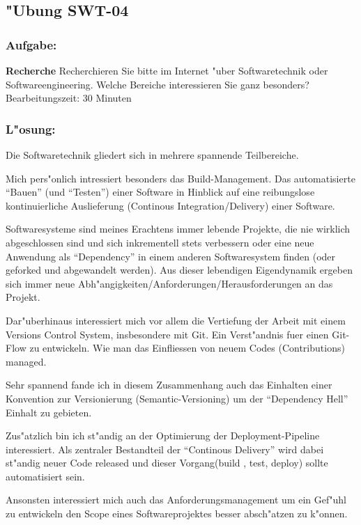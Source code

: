 \subsection{"Ubung SWT-04}
\subsubsection*{Aufgabe:}

\begin{framed}
\textbf{Recherche}
\smallbreak
Recherchieren Sie bitte im Internet "uber Softwaretechnik oder Softwareengineering. Welche Bereiche interessieren Sie ganz besonders?
\bigbreak
\small Bearbeitungszeit: 30 Minuten
\end{framed}
\bigbreak
\bigbreak
\subsubsection*{L"osung:}

Die Softwaretechnik gliedert sich in mehrere spannende Teilbereiche.

Mich pers"onlich intressiert besonders das Build-Management. Das automatisierte ``Bauen'' (und ``Testen'') einer Software in Hinblick auf eine reibungslose kontinuierliche Auslieferung (Continous Integration/Delivery) einer Software.

Softwaresysteme sind meines Erachtens immer lebende Projekte, die nie wirklich abgeschlossen sind und sich inkrementell stets verbessern oder eine neue Anwendung als ``Dependency'' in einem anderen Softwaresystem finden (oder geforked und abgewandelt werden).
Aus dieser lebendigen Eigendynamik ergeben sich immer neue Abh"angigkeiten/Anforderungen/Herausforderungen an das Projekt.

Dar"uberhinaus interessiert mich vor allem die Vertiefung der Arbeit mit einem Versions Control System, insbesondere mit Git.
Ein Verst"andnis fuer einen Git-Flow zu entwickeln. Wie man das Einfliessen von neuem Codes (Contributions) managed.

Sehr spannend fande ich in diesem Zusammenhang auch das Einhalten einer Konvention zur Versionierung (Semantic-Versioning) um der ``Dependency Hell'' Einhalt zu gebieten.

Zus"atzlich bin ich st"andig an der Optimierung der Deployment-Pipeline interessiert.
Als zentraler Bestandteil der ``Continous Delivery'' wird dabei st"andig neuer Code released und dieser Vorgang(build , test, deploy) sollte automatisiert sein.

Ansonsten interessiert mich auch das Anforderungsmanagement um ein Gef"uhl zu entwickeln den Scope eines Softwareprojektes besser absch"atzen zu k"onnen.

